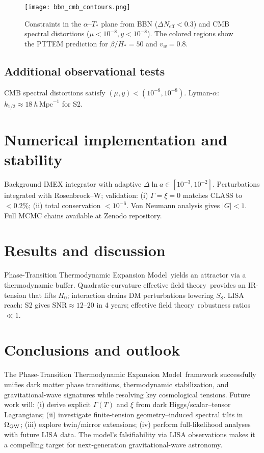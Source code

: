\documentclass[preprint,aps,prd,onecolumn,nofootinbib,longbibliography]{revtex4-2}
\newcommand{\PTTEM}{Phase-Transition Thermodynamic Expansion Model}
\newcommand{\EFT}{effective field theory}
\numberwithin{equation}{section}
\begin{document}
\begin{figure}[H]
  \centering
  \texttt{[image: bbn\_cmb\_contours.png]}
  \caption{
    Constraints in the \( \alpha \)–\( T_* \) plane from BBN (\( \Delta N_{\mathrm{eff}} < 0.3 \)) 
    and CMB spectral distortions (\( \mu < 10^{-8}, y < 10^{-8} \)). 
    The colored regions show the PTTEM prediction for \( \beta/H_* = 50 \) and \( v_w = 0.8 \).
  }
  \label{fig:bbn_cmb_contours}
\end{figure}

\subsection{Additional observational tests}
\label{sec:obs-extra}
CMB spectral distortions satisfy $(\mu,y)<(10^{-8},10^{-8})$. Lyman-$\alpha$: $k_{1/2}\!\approx\!18~h\,\mathrm{Mpc}^{-1}$ for S2.

\section{Numerical implementation and stability}
\label{sec:numerics}
Background IMEX integrator with adaptive $\Delta\ln a\in[10^{-3},10^{-2}]$. Perturbations integrated with Rosenbrock–W; validation: (i) $\Gamma=\xi=0$ matches CLASS to $<0.2\%$; (ii) total conservation $<10^{-6}$. Von Neumann analysis gives $|G|<1$. Full MCMC chains available at Zenodo repository.

\section{Results and discussion}
\label{sec:results}
\PTTEM\ yields an attractor via a thermodynamic buffer. Quadratic-curvature \EFT\ provides an IR-tension that lifts $H_0$; interaction drains DM perturbations lowering $S_8$. LISA reach: S2 gives $\mathrm{SNR}\approx 12$–$20$ in 4 years; \EFT\ robustness ratios $\ll 1$.

\section{Conclusions and outlook}
\label{sec:conclusion}
The \PTTEM\ framework successfully unifies dark matter phase transitions, thermodynamic stabilization, and gravitational-wave signatures while resolving key cosmological tensions. Future work will: (i) derive explicit $\Gamma(T)$ and $\xi$ from dark Higgs/scalar--tensor Lagrangians; (ii) investigate finite-tension geometry--induced spectral tilts in $\Omega_{\rm GW}$; (iii) explore twin/mirror extensions; (iv) perform full-likelihood analyses with future LISA data. The model's falsifiability via LISA observations makes it a compelling target for next-generation gravitational-wave astronomy.
\end{document}
